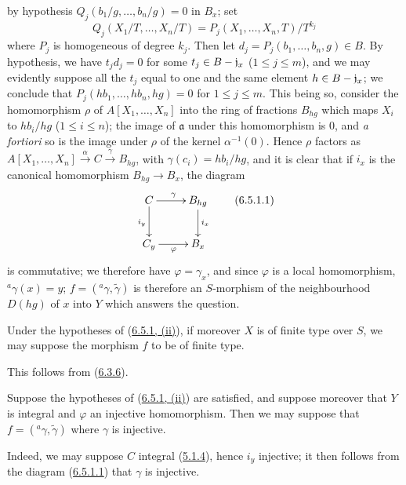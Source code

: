 \begin{enumerate}
    by hypothesis $Q_j(b_1/g,\ldots,b_n/g)=0$ in $B_x$; set
    \[
      Q_j(X_1/T,\ldots,X_n/T)
      =P_j(X_1,\ldots,X_n,T)/T^{k_j}
    \]
    where $P_j$ is homogeneous of degree $k_j$. Then let
    $d_j=P_j(b_1,\ldots,b_n,g)\in B$. By hypothesis, we have $t_jd_j=0$ for some
    $t_j\in B-\mathfrak{j}_x$ ($1\leq j\leq m$), and we may evidently
    suppose all the $t_j$
    equal to one and the same element $h\in B-\mathfrak{j}_x$; we conclude that
    $P_j(hb_1,\ldots,hb_n,hg)=0$ for $1\leq j\leq m$. This being so, consider
    the homomorphism $\rho$ of $A[X_1,\ldots,X_n]$ into the ring of fractions
    $B_{hg}$ which maps $X_i$ to $hb_i/hg$ ($1\leq i\leq n$); the image of
    $\mathfrak{a}$ under this homomorphism is 0, and \emph{a fortiori} so is
    the image under $\rho$ of the kernel $\alpha^{-1}(0)$. Hence $\rho$
    factors as
    $A[X_1,\ldots,X_n]\xrightarrow{\alpha}C\xrightarrow{\gamma}B_{hg}$, with
    $\gamma(c_i)=hb_i/hg$, and it is clear that if $i_x$ is the canonical
    homomorphism $B_{hg}\to B_x$, the diagram
    \[
      \xymatrix{
        C\ar[r]^\gamma\ar[d]_{i_y} & B_{hg}\ar[d]^{i_x}\\
        C_y\ar[r]_\varphi & B_x
      }
      \tag{6.5.1.1}\label{I.6.5.1.1}
    \]
    is commutative; we therefore have $\varphi=\gamma_x$, and since $\varphi$ is
    a local homomorphism, ${}^a\gamma(x)=y$; $f=({}^a\gamma,\widetilde{\gamma})$
    is therefore an $S$-morphism of the neighbourhood $D(hg)$ of $x$ into $Y$
    which answers the question.
\end{enumerate}

\begin{corollary}[6.5.2]
\label{I.6.5.2}
Under the hypotheses of \textup{(\hyperref[I.6.5.1]{6.5.1, (ii)})}, if moreover $X$
is of finite type over $S$, we may suppose the morphism $f$ to be of finite
type.
\end{corollary}

This follows from (\hyperref[I.6.3.6]{6.3.6}).

\begin{corollary}[6.5.3]
\label{I.6.5.3}
Suppose the hypotheses of
\textup{(\hyperref[I.6.5.1]{6.5.1, (ii)})} are satisfied, and suppose moreover that
$Y$ is integral and $\varphi$ an injective homomorphism. Then we may suppose
that $f=({}^a\gamma,\widetilde{\gamma})$ where $\gamma$ is injective.
\end{corollary}

Indeed, we may suppose $C$ integral
(\hyperref[I.5.1.4]{5.1.4}), hence $i_y$ injective; it then follows from the
diagram (\hyperref[I.6.5.1.1]{6.5.1.1}) that $\gamma$ is injective.

